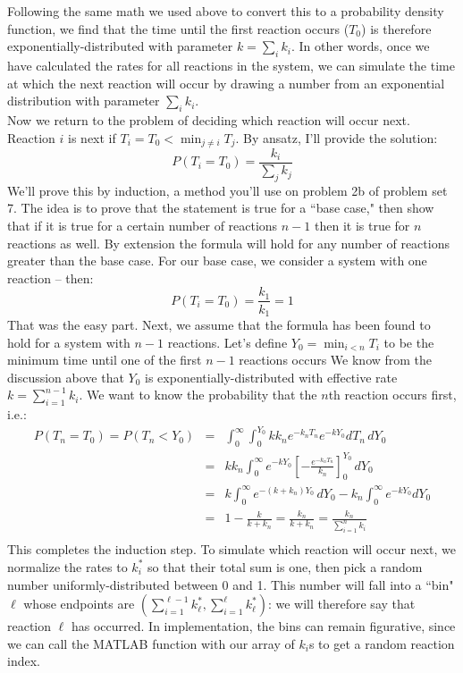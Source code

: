 \documentclass{article}
\begin{document}
Following the same math we used above to convert this to a probability density function, we find that the time until the first reaction occurs ($T_0$) is therefore exponentially-distributed with parameter $k = \sum_i k_i$. In other words, once we have calculated the rates for all reactions in the system, we can simulate the time at which the next reaction will occur by drawing a number from an exponential distribution with parameter $\sum_i k_i$.\\

Now we return to the problem of deciding which reaction will occur next. Reaction $i$ is next if $T_i = T_0 < \min_{j\neq i} T_j$. By ansatz, I'll provide the solution:
\[ P(T_i = T_0) = \frac{k_i}{\sum_j k_j} \]
We'll prove this by induction, a method you'll use on problem 2b of problem set 7. The idea is to prove that the statement is true for a ``base case," then show that if it is true for a certain number of reactions $n-1$ then it is true for $n$ reactions as well. By extension the formula will hold for any number of reactions greater than the base case. For our base case, we consider a system with one reaction -- then:
\[ P(T_i = T_0) = \frac{k_1}{k_1} = 1 \]
That was the easy part. Next, we assume that the formula has been found to hold for a system with $n-1$ reactions. Let's define $Y_0 = \min_{i<n} T_i$ to be the minimum time until one of the first $n-1$ reactions occurs We know from the discussion above that $Y_0$ is exponentially-distributed with effective rate $k = \sum_{i=1}^{n-1} k_i$. We want to know the probability that the $n$th reaction occurs first, i.e.:
\begin{eqnarray*}
P(T_n = T_0) = P(T_n < Y_0) & = & \int_0^{\infty} \int_0^{Y_0}  k k_n e^{-k_n T_n}e^{-k Y_0} dT_n \, dY_0 \\
& = & k k_n  \int_0^{\infty} e^{-k Y_0} \left[ - \frac{e^{-k_n T_n}}{k_n} \right]_0^{Y_0} \, dY_0\\
& = & k  \int_0^{\infty} e^{-\left( k + k_n \right) Y_0} \, dY_0  - k_n \int_0^{\infty} e^{-k Y_0} dY_0\\
& = & 1 - \frac{k}{k + k_n} = \frac{k_n}{k + k_n} = \frac{k_n}{\sum_{i=1}^n k_i} \\
\end{eqnarray*}
This completes the induction step. To simulate which reaction will occur next, we normalize the rates to $k_i^*$ so that their total sum is one, then pick a random number uniformly-distributed between 0 and 1. This number will fall into a ``bin"  $\ell$ whose endpoints are $(\sum_{i=1}^{\ell - 1} k_{\ell}^*, \sum_{i=1}^{\ell} k_{\ell}^*)$: we will therefore say that reaction $\ell$ has occurred. In implementation, the bins can remain figurative, since we can call the MATLAB function  with our array of $k_i$s to get a random reaction index.
\end{document}
